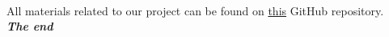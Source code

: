 \documentclass[english,11pt]{report}
\begin{document}
\\[1em]
\begin{center}
All materials related to our project can be found on  
\href{https://github.com/him1411/ps-project-eee}{this} GitHub repository.
\\[5em]

\textbf{\textit{The end}}
\end{center}
\end{document}

